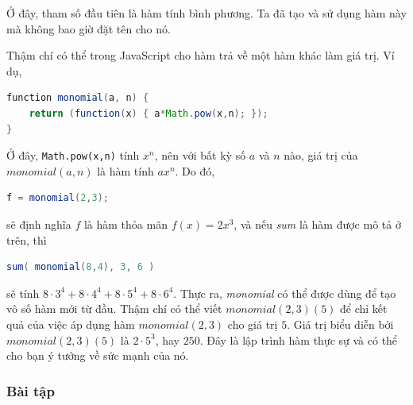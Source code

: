 Ở đây, tham số đầu tiên là hàm tính bình phương. Ta đã tạo và sử dụng hàm này mà không bao giờ đặt tên cho nó.

Thậm chí có thể trong JavaScript cho hàm trả về một hàm khác làm giá trị. Ví dụ,

\begin{lstlisting}[language=Java]
function monomial(a, n) {
    return (function(x) { a*Math.pow(x,n); });
}
\end{lstlisting}

Ở đây, \texttt{Math.pow(x,n)} tính $x^n$, nên với bất kỳ số $a$ và $n$ nào, giá trị của $\mathit{monomial}(a,n)$ là hàm tính $ax^n$. Do đó,

\begin{lstlisting}[language=Java]
f = monomial(2,3);
\end{lstlisting}

sẽ định nghĩa $f$ là hàm thỏa mãn $f(x) = 2x^3$, và nếu \textit{sum} là hàm được mô tả ở trên, thì

\begin{lstlisting}[language=Java]
sum( monomial(8,4), 3, 6 )
\end{lstlisting}

sẽ tính $8 \cdot 3^4 + 8 \cdot 4^4 + 8 \cdot 5^4 + 8 \cdot 6^4$. Thực ra, \textit{monomial} có thể được dùng để tạo vô số hàm mới từ đầu. Thậm chí có thể viết $\mathit{monomial}(2,3)(5)$ để chỉ kết quả của việc áp dụng hàm $\mathit{monomial}(2,3)$ cho giá trị $5$. Giá trị biểu diễn bởi $\mathit{monomial}(2,3)(5)$ là $2 \cdot 5^3$, hay $250$. Đây là lập trình hàm thực sự và có thể cho bạn ý tưởng về sức mạnh của nó.

\subsubsection*{Bài tập}

